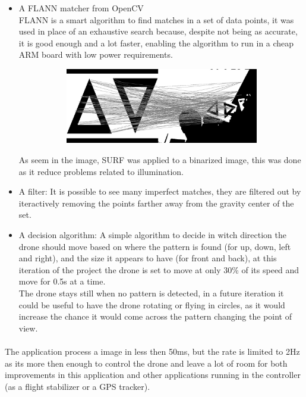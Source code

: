 \documentclass[11pt,twoside,a4paper]{article}
\begin{document}
\begin{itemize}
  \item A FLANN matcher from OpenCV\\
FLANN is a smart algorithm to find matches in a set of data points, it was used
in place of an exhaustive search because, despite not being as accurate, it is
good enough and a lot faster, enabling the algorithm to run in a cheap ARM board
with low power requirements.
\begin{figure}[hbtp]
  \centering
\begin{subfigure}{1.00\textwidth}
  \centering
  \includegraphics[width=1.00\linewidth]{matches.jpg}
\end{subfigure}
\end{figure}
As seem in the image, SURF was applied to a binarized image, this was done as it
reduce problems related to illumination.

  \item A filter: It is possible to see many imperfect matches, they are
filtered out by iteractively removing the points farther away from the gravity
center of the set.

  \item A decision algorithm: A simple algorithm to decide in witch direction
the drone should move based on where the pattern is found (for up, down, left
and right), and the size it appears to have (for front and back), at this
iteration of the project the drone is set to move at only 30\% of its speed
and move for 0.5s at a time.\\
The drone stays still when no pattern is detected, in a future iteration it
could be useful to have the drone rotating or flying in circles, as it would
increase the chance it would come across the pattern changing the point of
view.
\end{itemize}
\paragraph{} The application process a image in less then 50ms, but the rate is
limited to 2Hz as its more then enough to control the drone and leave a lot of
room for both improvements in this application and other applications running in
the controller (as a flight stabilizer or a GPS tracker).
\end{document}
